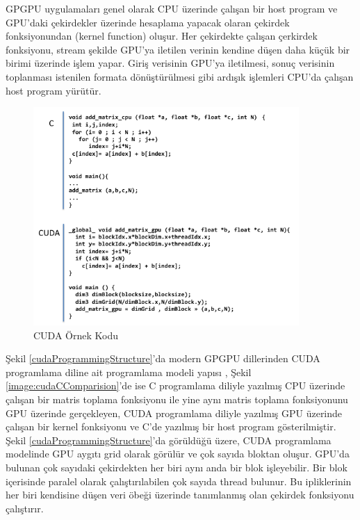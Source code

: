 GPGPU uygulamaları genel olarak CPU üzerinde çalışan bir host program ve GPU’daki çekirdekler üzerinde hesaplama yapacak olaran çekirdek fonksiyonundan (kernel function) oluşur. Her çekirdekte çalışan çerkirdek fonksiyonu, stream şekilde GPU’ya iletilen verinin kendine düşen daha küçük bir birimi üzerinde işlem yapar. Giriş verisinin GPU’ya iletilmesi, sonuç verisinin toplanması istenilen formata dönüştürülmesi gibi ardışık işlemleri CPU’da çalışan host program yürütür. \par
\begin{figure}[h]
\centering
\shorthandoff{=}
\includegraphics[width=0.9\textwidth]{gorsel/cudaCComparision.png}
\shorthandoff{=}
\caption{CUDA Örnek Kodu}
\label{cudaCComparision}
\end{figure}
Şekil \ref{cudaProgrammingStructure}’da modern GPGPU dillerinden CUDA programlama diline ait programlama modeli yapısı \cite{cudaProgrammingStructure},  Şekil \ref{image:cudaCComparision}’de ise C programlama diliyle yazılmış CPU üzerinde çalışan bir matris toplama fonksiyonu ile yine aynı matris toplama fonksiyonunu GPU üzerinde gerçekleyen, CUDA programlama diliyle yazılmış GPU üzerinde çalışan bir kernel fonksiyonu ve C’de yazılmış bir host program gösterilmiştir. Şekil \ref{cudaProgrammingStructure}’da görüldüğü üzere, CUDA programlama modelinde GPU aygıtı grid olarak görülür ve çok sayıda bloktan oluşur. GPU’da bulunan çok sayıdaki çekirdekten her biri aynı anda bir blok işleyebilir. Bir blok içerisinde paralel olarak çalıştırılabilen çok sayıda thread bulunur. Bu ipliklerinin her biri kendisine düşen veri öbeği üzerinde tanımlanmış olan çekirdek fonksiyonu çalıştırır.

